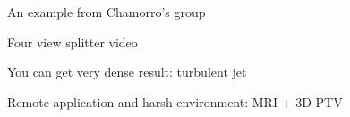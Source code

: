     
\begin{frame}[label=app-8]{An example from Chamorro's group}
    \centering{}
\end{frame}
    
\begin{frame}[label=app-9]{Four view splitter video}
\end{frame}
    
\begin{frame}[label=app-10]{You can get very dense result: turbulent jet}
        \centering{}
\end{frame}


\begin{frame}[label=app-13]{Remote application and harsh environment: MRI + 3D-PTV}
    \begin{columns}
        \centering{}
    \end{columns}
\end{frame}

